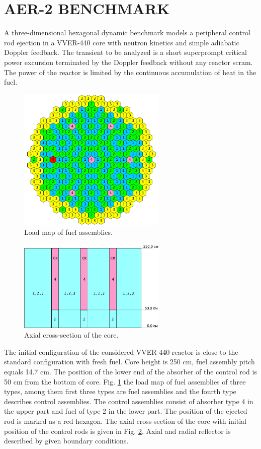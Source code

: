 \documentclass{aip-cp}
\begin{document}
\section{AER-2 BENCHMARK}
A three-dimensional hexagonal dynamic benchmark \cite{grundman} models a peripheral control rod ejection in a VVER-440 core with neutron kinetics and simple adiabatic Doppler feedback. The transient to be analyzed is a short superprompt critical power excursion terminated by the Doppler feedback without any reactor scram.  The power of the reactor is limited by the continuous accumulation of heat in the fuel.
\begin{figure}[!h]
  \centerline{\includegraphics[width=200pt]{geo_cartogramm.jpg}}
  \caption{Load map of fuel assemblies.}
  \label{fig:1}
\end{figure}
\begin{figure}[!h]
  \centerline{\includegraphics[width=200pt]{geo_axial.jpg}}
  \caption{Axial cross-section of the core.}
  \label{fig:2}
\end{figure}

The initial configuration of the considered VVER-440 reactor is close to the standard configuration with fresh fuel. Core height is 250 cm, fuel assembly pitch equals 14.7 cm. The position of the lower end of the absorber of the control rod is 50 cm from the bottom of core. Fig. \ref{fig:1} the load map of fuel assemblies of three types, among them first three types are fuel assemblies and the fourth type describes control assemblies.  The control assemblies consist of absorber type 4 in the upper part and fuel of type 2 in the lower part. The position of the ejected rod is marked as a red hexagon. The axial cross-section of the core with initial position of the control rods is given in Fig. \ref{fig:2}. Axial and radial reflector is described by given boundary conditions. 
\end{document}

